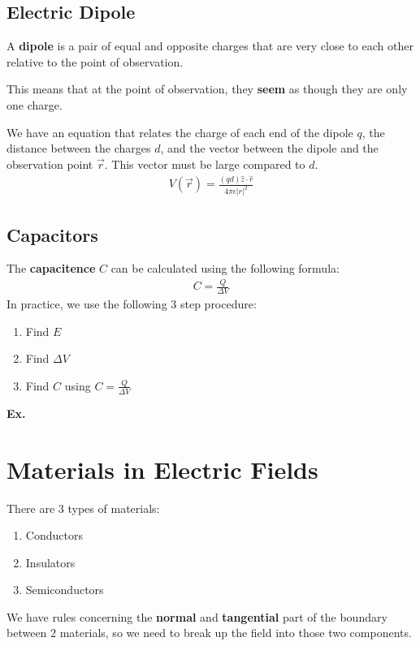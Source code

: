 \documentclass[12pt,letterpaper]{article} \usepackage{amsmath} \usepackage{graphicx} \usepackage[margin=1in]{geometry} \usepackage{longtable}  \usepackage{amssymb}
\begin{document}
	\subsection{Electric Dipole}
	A \textbf{dipole} is a pair of equal and opposite charges that are very close to each other relative to the point of observation.
	
	This means that at the point of observation, they \textbf{seem} as though they are only one charge. 
	
	We have an equation that relates the charge of each end of the dipole $q$, the distance between the charges $d$, and the vector between the dipole and the observation point $\vec r$. This vector must be large compared to $d$.
	\begin{align*}
		V(\vec r) = \frac{(qd) \hat z \cdot \hat r}{4\pi \epsilon |r|^2}
	\end{align*}

	\subsection{Capacitors}
	The \textbf{capacitence} $C$ can be calculated using the following formula:
	\begin{align*}
		C=\frac{Q}{\Delta V}
	\end{align*}
	In practice, we use the following 3 step procedure:
	\begin{enumerate}[noitemsep]
		\item Find $E$
		\item Find $\Delta V$
		\item Find $C$ using $C=\frac{Q}{\Delta V} $
	\end{enumerate}

	\begin{mdframed}
		\textbf{Ex. }
	\end{mdframed}
	
	\section{Materials in Electric Fields}
	There are 3 types of materials:
	\begin{enumerate}[]
		\item Conductors
		\item Insulators
		\item Semiconductors
	\end{enumerate}

	We have rules concerning the \textbf{normal} and \textbf{tangential} part of the boundary between 2 materials, so we need to break up the field into those two components. 
	
\end{document}
